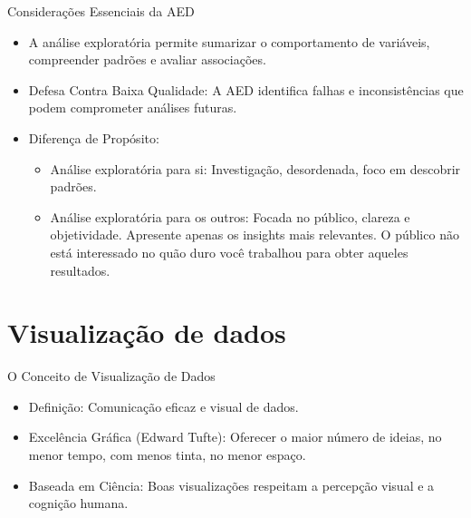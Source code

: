 \documentclass[
  ignorenonframetext,
  serif,
  professionalfont,
  usenames,
  dvipsnames,
  aspectratio = 169]{beamer}
\providecommand{\tightlist}{%
  \setlength{\itemsep}{0pt}\setlength{\parskip}{0pt}}
\renewcommand{\tightlist}{%
  \setlength{\itemsep}{0\baselineskip}
  \setlength{\parskip}{0.25\baselineskip}
}
\begin{document}
\begin{frame}{Considerações Essenciais da AED}
\label{considerauxe7uxf5es-essenciais-da-aed}
\begin{itemize}
\item
  A análise exploratória permite sumarizar o comportamento de variáveis,
  compreender padrões e avaliar associações.
\item
  Defesa Contra Baixa Qualidade: A AED identifica falhas e
  inconsistências que podem comprometer análises futuras.
\end{itemize}

\vspace{0.3cm}

\begin{itemize}
\item
  Diferença de Propósito:

  \begin{itemize}
  \item
    Análise exploratória para si: Investigação, desordenada, foco em
    descobrir padrões.
  \item
    Análise exploratória para os outros: Focada no público, clareza e
    objetividade. Apresente apenas os insights mais relevantes. O
    público não está interessado no quão duro você trabalhou para obter
    aqueles resultados.
  \end{itemize}
\end{itemize}
\end{frame}

\section{Visualização de dados}\label{visualizauxe7uxe3o-de-dados}

\begin{frame}{O Conceito de Visualização de Dados}
\label{o-conceito-de-visualizauxe7uxe3o-de-dados}
\begin{itemize}
\tightlist
\item
  Definição: Comunicação eficaz e visual de dados.
\end{itemize}

\vspace{0.3cm}

\begin{itemize}
\tightlist
\item
  Excelência Gráfica (Edward Tufte): Oferecer o maior número de ideias,
  no menor tempo, com menos tinta, no menor espaço.
\end{itemize}

\vspace{0.3cm}

\begin{itemize}
\tightlist
\item
  Baseada em Ciência: Boas visualizações respeitam a percepção visual e
  a cognição humana.
\end{itemize}
\end{frame}
\end{document}
